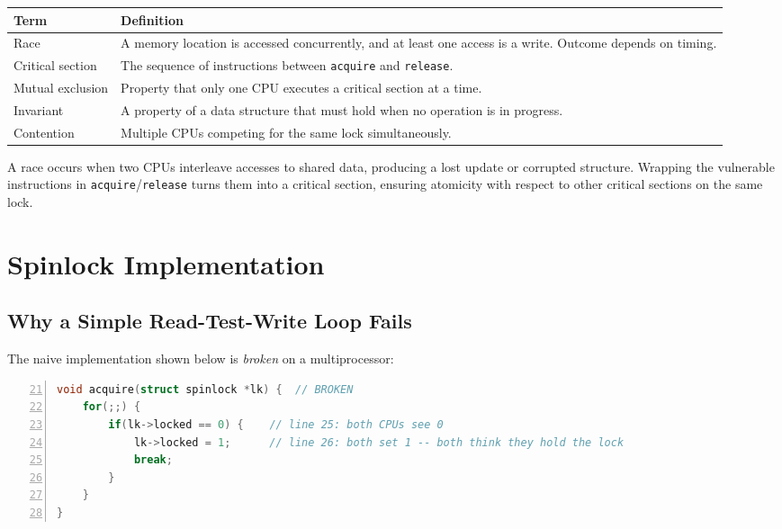 \documentclass[11pt, a4paper]{article}
\begin{document}
\begin{center}
\renewcommand{\arraystretch}{1.3}
\begin{tabular}{@{}lp{10cm}@{}}
\toprule
\textbf{Term} & \textbf{Definition} \\
\midrule
Race           & A memory location is accessed concurrently, and at least one access is a write. Outcome depends on timing. \\
Critical section & The sequence of instructions between \lstinline|acquire| and \lstinline|release|. \\
Mutual exclusion & Property that only one CPU executes a critical section at a time. \\
Invariant      & A property of a data structure that must hold when no operation is in progress. \\
Contention     & Multiple CPUs competing for the same lock simultaneously. \\
\bottomrule
\end{tabular}
\end{center}

\begin{tcolorbox}[summary, title={Section Summary}]
A race occurs when two CPUs interleave accesses to shared data, producing a lost update or corrupted structure. Wrapping the vulnerable instructions in \lstinline|acquire|/\lstinline|release| turns them into a critical section, ensuring atomicity with respect to other critical sections on the same lock.
\end{tcolorbox}

\section{Spinlock Implementation}

\subsection{Why a Simple Read-Test-Write Loop Fails}

The naive implementation shown below is \emph{broken} on a multiprocessor:

\begin{lstlisting}[language=C, numbers=left, firstnumber=21]
void acquire(struct spinlock *lk) {  // BROKEN
    for(;;) {
        if(lk->locked == 0) {    // line 25: both CPUs see 0
            lk->locked = 1;      // line 26: both set 1 -- both think they hold the lock
            break;
        }
    }
}
\end{lstlisting}
\end{document}
